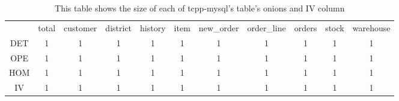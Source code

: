 \begin{table}
\renewcommand{\arraystretch}{1.3}
\label{tab:example}
\centering
\begin{tabular}{|c|c|c|c|c|c|c|c|c|c|c|}
  \hline
&total & customer & district & history & item & new\_order & order\_line & orders & stock & warehouse   \\
DET & 1 & 1 & 1 & 1 & 1 & 1 & 1 & 1 & 1&1 \\  
OPE & 1 & 1 & 1 & 1 & 1 & 1 & 1 & 1 & 1&1 \\
HOM & 1 & 1 & 1 & 1 & 1 & 1 & 1 & 1 & 1&1 \\
IV & 1 & 1 & 1 & 1 & 1 & 1 & 1 & 1 & 1&1 \\
\hline
\end{tabular}
\caption{This table shows the size of each of tcpp-mysql's table's onions and IV column}
\end{table}